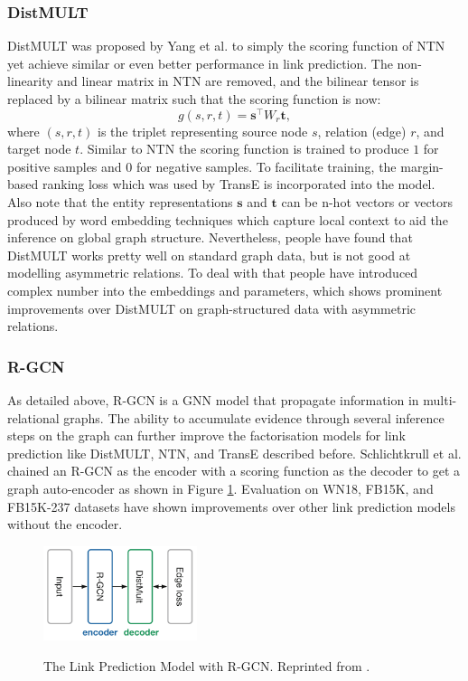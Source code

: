 \documentclass[12pt]{report}
\begin{document}
\subsubsection{DistMULT}
DistMULT \cite{yang_embedding_2014} was proposed by Yang et al. to simply the scoring function of NTN yet achieve similar or even better performance in link prediction. The non-linearity and linear matrix in NTN are removed, and the bilinear tensor is replaced by a bilinear matrix such that the scoring function is now:
\[g(s,r,t) = \mathbf{s}^\top W_r\mathbf{t},\]
where $(s,r,t)$ is the triplet representing source node $s$, relation (edge) $r$, and target node $t$. Similar to NTN the scoring function is trained to produce $1$ for positive samples and $0$ for negative samples. To facilitate training, the margin-based ranking loss which was used by TransE is incorporated into the model. Also note that the entity representations $\mathbf{s}$ and $\mathbf{t}$ can be n-hot vectors or vectors produced by word embedding techniques which capture local context to aid the inference on global graph structure. Nevertheless, people have found that DistMULT works pretty well on standard graph data, but is not good at modelling asymmetric relations. To deal with that people have introduced complex number into the embeddings and parameters, which shows prominent improvements over DistMULT on graph-structured data with asymmetric relations.

\subsubsection{R-GCN}
As detailed above, R-GCN is a GNN model that propagate information in multi-relational graphs. The ability to accumulate evidence through several inference steps on the graph can further improve the factorisation models for link prediction like DistMULT, NTN, and TransE described before. Schlichtkrull et al. chained an R-GCN as the encoder with a scoring function as the decoder to get a graph auto-encoder \cite{kipf_variational_2016} as shown in Figure \ref{lp_model}. Evaluation on WN18, FB15K, and FB15K-237 \cite{toutanova_observed_2015} datasets have shown improvements over other link prediction models without the encoder.
\begin{figure}[H]
\centering
\includegraphics[width=0.4\textwidth]{lp_model.png}
\label{lp_model}
\caption[The Link Prediction Model with R-GCN]{The Link Prediction Model with R-GCN. Reprinted from \cite{schlichtkrull_modeling_2018}.}
\end{figure}
\end{document}
